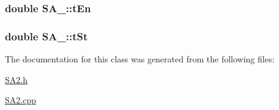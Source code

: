 \subsubsection[{t\+En}]{\setlength{\rightskip}{0pt plus 5cm}double S\+A\+\_\+::t\+En\hspace{0.3cm}{\ttfamily [private]}}\label{classSA__2_a11eb83d386c783b62689b95a1d61f81b}
\hypertarget{classSA__2_a826b4a07815b519edd1821b07a0ed1f6}{}
\subsubsection[{t\+St}]{\setlength{\rightskip}{0pt plus 5cm}double S\+A\+\_\+::t\+St\hspace{0.3cm}{\ttfamily [private]}}\label{classSA__2_a826b4a07815b519edd1821b07a0ed1f6}


The documentation for this class was generated from the following files\+:\begin{DoxyCompactItemize}
\item 
\hyperlink{SA2_8h}{S\+A2.\+h}\item 
\hyperlink{SA2_8cpp}{S\+A2.\+cpp}\end{DoxyCompactItemize}
